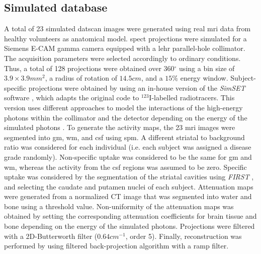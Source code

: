 \documentclass{frontiers}
\newcommand{\cbstart}{\relax}
\newcommand{\cbend}{\relax}
\newcommand{\degree}{\ensuremath{^{\circ}}}
\begin{document}
\subsection{Simulated database} %
\label{sec:data_simulated}
\cbstart
A total of 23 simulated \gls*{datscan} images were generated using real
  \gls*{mri} data from healthy volunteers as anatomical model.
\cbend
\Gls*{spect} projections were simulated for a Siemens E-CAM gamma
  camera equipped with a \acrlong*{lehr} parallel-hole collimator.
The acquisition parameters were selected accordingly to ordinary conditions.
Thus, a total of 128 projections were obtained over 360{\degree} using a
  bin size of $3.9\times3.9mm^{2}$, a radius of rotation of $14.5cm$, and
  a $15\%$ energy window.
Subject-specific projections were obtained by using an in-house version
  \citep{crespo_quantification_2008} of the \emph{SimSET} software
  \citep{harrison_preliminary_1993}, which adapts the original code
  to $^{123}$I-labelled radiotracers.
This version uses different approaches to model the interactions of
  the high-energy photons within the collimator and the detector depending
  on the energy of the simulated photons 
  \citep{cot_study_2004, cot_modeling_2006}.
To generate the activity maps, the 23 \gls*{mri} images
  were segmented into \gls*{gm}, \gls*{wm}, and \gls*{csf}
  using \gls*{spm}.
A different striatal to background ratio was considered for each individual
  (i.e. each subject was assigned a disease grade randomly).
Non-specific uptake was considered to be the same for \gls*{gm} and \gls*{wm},
  whereas the activity from the \gls*{csf} regions was assumed to be zero.
Specific uptake was considered by the segmentation of the striatal cavities
  using \emph{FIRST} \citep{patenaude_bayesian_2011},
  and selecting the caudate and putamen nuclei of each subject.
Attenuation maps were generated from a normalized CT image that was
  segmented into water and bone using a threshold value.
Non-uniformity of the attenuation maps was obtained by setting the
  corresponding attenuation coefficients for brain tissue and bone
  depending on the energy of the simulated photons.
Projections were filtered with a 2D-Butterworth filter ($0.64cm^{-1}$,
  order 5). Finally, reconstruction was performed by using filtered 
  back-projection algorithm with a ramp filter.
\end{document}
